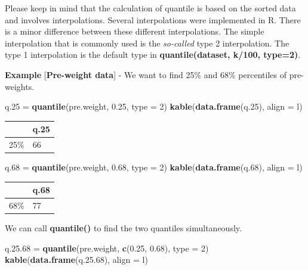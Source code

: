 \documentclass[
]{book}
\newenvironment{Shaded}{\begin{snugshade}}{\end{snugshade}}
\newcommand{\AttributeTok}[1]{\textcolor[rgb]{0.13,0.29,0.53}{#1}}
\newcommand{\DecValTok}[1]{\textcolor[rgb]{0.00,0.00,0.81}{#1}}
\newcommand{\FloatTok}[1]{\textcolor[rgb]{0.00,0.00,0.81}{#1}}
\newcommand{\FunctionTok}[1]{\textcolor[rgb]{0.13,0.29,0.53}{\textbf{#1}}}
\newcommand{\NormalTok}[1]{#1}
\newcommand{\OtherTok}[1]{\textcolor[rgb]{0.56,0.35,0.01}{#1}}
\newcommand{\StringTok}[1]{\textcolor[rgb]{0.31,0.60,0.02}{#1}}
\begin{document}
Please keep in mind that the calculation of quantile is based on the sorted data and involves interpolations. Several interpolations were implemented in R. There is a minor difference between these different interpolations. The simple interpolation that is commonly used is the \emph{so-called} type 2 interpolation. The type 1 interpolation is the default type in \textbf{quantile(dataset, k/100, type=2)}.

\textbf{Example} {[}\textbf{Pre-weight data}{]} - We want to find 25\% and 68\% percentiles of pre-weights.

\begin{Shaded}
\begin{Highlighting}[]
\NormalTok{q}\FloatTok{.25} \OtherTok{=} \FunctionTok{quantile}\NormalTok{(pre.weight, }\FloatTok{0.25}\NormalTok{, }\AttributeTok{type =} \DecValTok{2}\NormalTok{)}
\FunctionTok{kable}\NormalTok{(}\FunctionTok{data.frame}\NormalTok{(q}\FloatTok{.25}\NormalTok{), }\AttributeTok{align =} \StringTok{\textquotesingle{}l\textquotesingle{}}\NormalTok{)}
\end{Highlighting}
\end{Shaded}

\begin{tabular}{l|l}
\hline
  & q.25\\
\hline
25\% & 66\\
\hline
\end{tabular}

\begin{Shaded}
\begin{Highlighting}[]
\NormalTok{q}\FloatTok{.68} \OtherTok{=} \FunctionTok{quantile}\NormalTok{(pre.weight, }\FloatTok{0.68}\NormalTok{, }\AttributeTok{type =} \DecValTok{2}\NormalTok{)}
\FunctionTok{kable}\NormalTok{(}\FunctionTok{data.frame}\NormalTok{(q}\FloatTok{.68}\NormalTok{), }\AttributeTok{align =} \StringTok{\textquotesingle{}l\textquotesingle{}}\NormalTok{)}
\end{Highlighting}
\end{Shaded}

\begin{tabular}{l|l}
\hline
  & q.68\\
\hline
68\% & 77\\
\hline
\end{tabular}

We can call \textbf{quantile()} to find the two quantiles simultaneously.

\begin{Shaded}
\begin{Highlighting}[]
\NormalTok{q.}\FloatTok{25.68} \OtherTok{=} \FunctionTok{quantile}\NormalTok{(pre.weight, }\FunctionTok{c}\NormalTok{(}\FloatTok{0.25}\NormalTok{, }\FloatTok{0.68}\NormalTok{), }\AttributeTok{type =} \DecValTok{2}\NormalTok{)}
\FunctionTok{kable}\NormalTok{(}\FunctionTok{data.frame}\NormalTok{(q.}\FloatTok{25.68}\NormalTok{), }\AttributeTok{align =} \StringTok{\textquotesingle{}l\textquotesingle{}}\NormalTok{)}
\end{Highlighting}
\end{Shaded}
\end{document}
